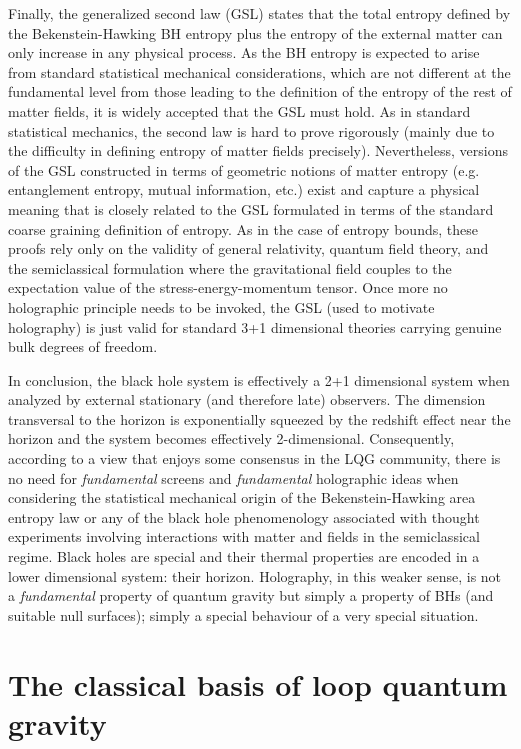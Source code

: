 \documentclass[aps, nofootinbib,superscriptaddress,12pt]{revtex4-2}
\begin{document}
Finally, the generalized second law (GSL) states that the total entropy defined by the Bekenstein-Hawking BH entropy plus the entropy of the external matter can only increase in any physical process. As the BH entropy is expected to arise from  standard statistical mechanical considerations, which are not different at the fundamental level from those leading to the definition of the entropy of the rest of matter fields, it is widely accepted that the GSL must hold. As in standard statistical mechanics, the second law is hard to prove rigorously (mainly due to the difficulty in defining entropy of matter fields precisely). Nevertheless, versions of the GSL constructed in terms of geometric notions of matter entropy (e.g. entanglement entropy, mutual information, etc.) exist \cite{Wall:2011hj} and capture a physical meaning that is closely related to the GSL formulated in terms of the standard coarse graining definition of entropy. As in the case of entropy bounds, these proofs rely only on the validity of general relativity, quantum field theory, and the semiclassical formulation where the gravitational field couples to the expectation value of the stress-energy-momentum tensor. Once more no holographic principle needs to be invoked, the GSL (used to motivate holography) is just valid for standard 3+1 dimensional theories carrying genuine bulk degrees of freedom.

In conclusion, the black hole system is effectively a 2+1 dimensional system when analyzed by external stationary (and therefore late) observers. The dimension transversal to the horizon is exponentially squeezed by the redshift effect near the horizon and the system becomes effectively 2-dimensional.   Consequently, according to a view that enjoys some consensus in the LQG community, there is no need for {\em fundamental} screens and {\em fundamental} holographic ideas when considering the statistical mechanical origin of the Bekenstein-Hawking area entropy law or any of the black hole phenomenology associated with thought experiments involving interactions with matter and fields in the semiclassical regime. Black holes are special and their thermal properties are encoded in a lower dimensional system: their horizon. Holography, in this weaker sense, is not a {\em fundamental} property of quantum gravity but simply a property of BHs (and suitable null surfaces); simply a special behaviour of a very special situation.


\section{The classical basis of loop quantum gravity} \label{two}
\end{document}

